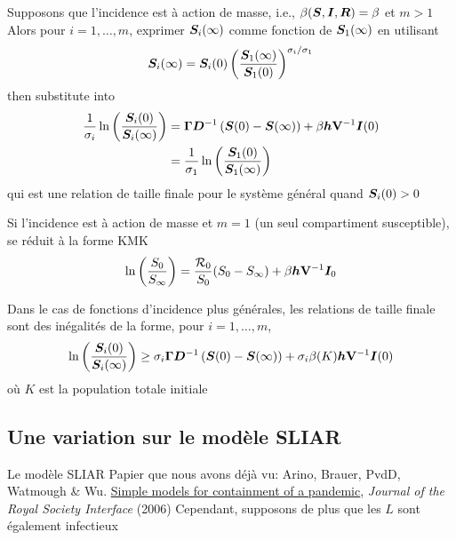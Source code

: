 \documentclass[aspectratio=169]{beamer}\usepackage[]{graphicx}\usepackage[]{xcolor}
\begin{document}
\begin{frame}
Supposons que l'incidence est à action de masse, i.e., $\beta(\bm{S},\bm{I},\bm{R})=\beta$ et $m>1$
\vfill
Alors pour $i=1,\ldots,m$, exprimer $\bm{S}_i(\infty)$ comme fonction de $\bm{S}_1(\infty)$ en utilisant
$$
\bm{S}_i(\infty)  = 
\bm{S}_i(0) \left(
\frac{\bm{S}_1(\infty)}{\bm{S}_1(0)}
\right)^{\sigma_i/\sigma_1}
$$
then substitute into 
\begin{align*}
\frac{1}{\sigma_i}
\ln\left(\frac{\bm{S}_i(0)}{\bm{S}_i(\infty)}\right)
&=
\bm{\Gamma}\bm{D}^{-1}\left(\bm{S}(0)-\bm{S}(\infty)\right)
+\beta\bm{h}\mathbf{V}^{-1}\bm{I}(0) \\
&= 
\frac{1}{\sigma_1}
\ln\left(\frac{\bm{S}_1(0)}{\bm{S}_1(\infty)}\right)
\end{align*}
qui est une relation de taille finale pour le système général quand $\bm{S}_i(0)>0$
\end{frame}  


\begin{frame}
Si l'incidence est à action de masse et $m=1$ (un seul compartiment susceptible), se réduit à la forme KMK
\begin{equation}
\label{eq:final_size_m1}
\ln\left(
\frac{S_0}{S_\infty}
\right)
=\frac{\mathcal{R}_0}{S_0}
(S_0-S_\infty)+\beta\bm{h}\mathbf{V}^{-1}\bm{I}_0
\end{equation}
\end{frame}  


\begin{frame}
Dans le cas de fonctions d'incidence plus générales, les relations de taille finale sont des inégalités de la forme, pour $i=1,\ldots,m$,
$$
\ln\left(\frac{\bm{S}_i(0)}{\bm{S}_i(\infty)}\right)
\geq
\sigma_i\bm{\Gamma}\bm{D}^{-1}\left(\bm{S}(0)-\bm{S}(\infty)\right)
+\sigma_i\beta(K)\bm{h}\mathbf{V}^{-1}\bm{I}(0)
$$
où $K$ est la population totale initiale
\end{frame}  

\subsection{Une variation sur le modèle SLIAR}

\begin{frame}{Le modèle SLIAR}
\bbullet Papier que nous avons déjà vu: Arino, Brauer, PvdD, Watmough \& Wu. \href{http://dx.doi.org/10.1098/rsif.2006.0112}{Simple models for containment of a pandemic}, \emph{Journal of the Royal Society Interface} (2006)
\vfill
\bbullet Cependant, supposons de plus que les $L$ sont également infectieux
\end{frame}  
\end{document}
